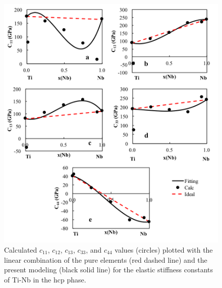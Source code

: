 \pagebreak
\begin{figure}[H]
	\centering
	\includegraphics[width=\textwidth]{Chapter-7/Figures/hcpe1.png}
	\caption{Calculated $c_{11}$, $c_{12}$, $c_{13}$, $c_{33}$, and $c_{44}$ values (circles) plotted with the linear combination of the pure elements (red dashed line) and the present modeling (black solid line) for the elastic stiffness constants of Ti-Nb in the hcp phase.}
	\label{Ch7-figure:hcpe1}
\end{figure}

